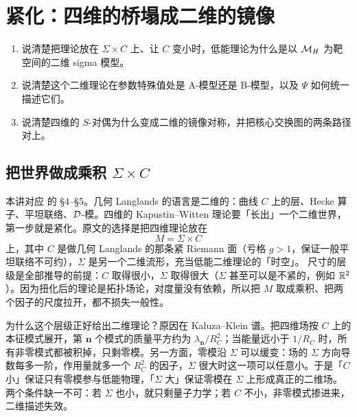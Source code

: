 \section{紧化：四维的桥塌成二维的镜像}
\label{sec:compact}

\begin{goals}
\begin{enumerate}
\item 说清楚把理论放在 $\Sigma\times C$ 上、让 $C$ 变小时，低能理论为什么是以 $\mathcal{M}_{H}$ 为靶空间的二维 sigma 模型。
\item 说清楚这个二维理论在参数特殊值处是 A-模型还是 B-模型，以及 $\Psi$ 如何统一描述它们。
\item 说清楚四维的 $S$-对偶为什么变成二维的镜像对称，并把核心交换图的两条路径对上。
\end{enumerate}
\end{goals}

\subsection{把世界做成乘积 $\Sigma\times C$}

本讲对应 \cite{kw06} 的 §4--§5。几何 Langlands 的语言是二维的：曲线 $C$ 上的层、Hecke 算子、平坦联络、$\mathcal{D}$-模。四维的 Kapustin--Witten 理论要「长出」一个二维世界，第一步就是紧化。原文的选择是把四维理论放在
\begin{equation}
M=\Sigma\times C
\label{eq:M-prod}
\end{equation}
上，其中 $C$ 是做几何 Langlands 的那条紧 Riemann 面（亏格 $g>1$，保证一般平坦联络不可约），$\Sigma$ 是另一个二维流形，充当低能二维理论的「时空」。 尺寸的层级是全部推导的前提：$C$ 取得很小，$\Sigma$ 取得很大（$\Sigma$ 甚至可以是不紧的，例如 $\mathbb{R}^2$）。因为扭化后的理论是拓扑场论，对度量没有依赖，所以把 $M$ 取成乘积、把两个因子的尺度拉开，都不损失一般性。

为什么这个层级正好给出二维理论？原因在 Kaluza--Klein 谱。把四维场按 $C$ 上的本征模式展开，第 $\mathbf n$ 个模式的质量平方约为 $\lambda_{\mathbf n}/R_C^2$；当能量远小于 $1/R_C$ 时，所有非零模式都被积掉，只剩零模。另一方面，零模沿 $\Sigma$ 可以缓变：场的 $\Sigma$ 方向导数每多一阶，作用量就多一个 $R_C^2$ 的因子，$\Sigma$ 很大时这一项可以任意小。于是「$C$ 小」保证只有零模参与低能物理，「$\Sigma$ 大」保证零模在 $\Sigma$ 上形成真正的二维场。两个条件缺一不可：若 $\Sigma$ 也小，就只剩量子力学；若 $C$ 不小，非零模式掺进来，二维描述失效。

